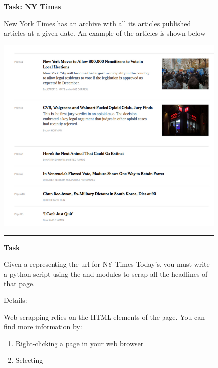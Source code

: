 

\begin{figure}
\begin{mdframed}[backgroundcolor=gray!04] 
\begin{scriptsize}

{\large \textbf{Task: NY Times}} \bigskip


New York Times has an archive with all its articles published articles at a given date. An example of the articles is shown below

\medskip

\includegraphics[width=\textwidth]{appendix/cp6/rsz_nytimes.png}

\medskip

\begin{center}
\rule{10cm}{0.4pt}
\end{center}

\textbf{Task} \medskip



Given a  representing the url for NY Times Today's, you must write a python script using the  and  modules to scrap all the headlines of that page. \medskip



Details:\medskip


Web scrapping relies on the HTML elements of the page. You can find more information by:

\begin{enumerate}


    \item  Right-clicking a page in your web browser

    \item  Selecting 


\end{enumerate}

\end{scriptsize}
\end{mdframed}
\end{figure}
  


